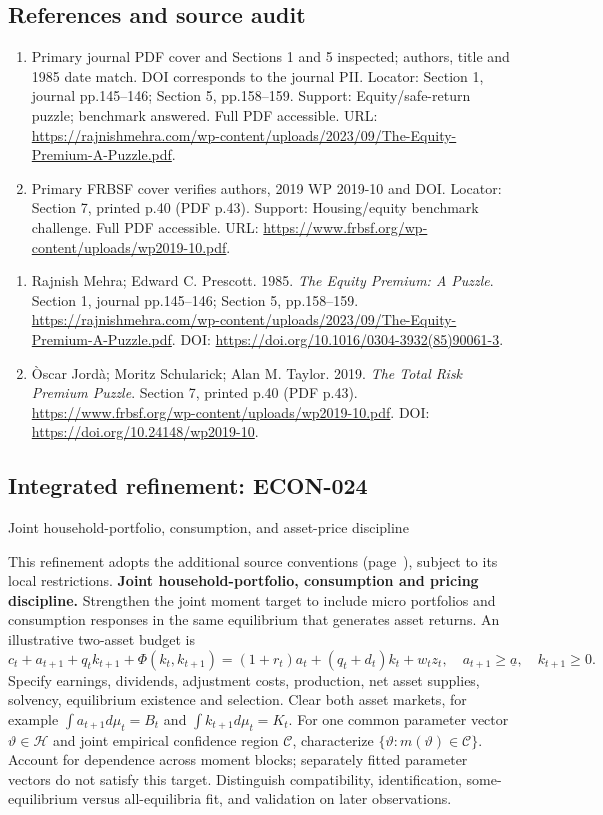 \documentclass[11pt,a4paper]{article}
\begin{document}
\subsection*{References and source audit}
\begin{enumerate}
\item Primary journal PDF cover and Sections 1 and 5 inspected; authors, title and 1985 date match. DOI corresponds to the journal PII. Locator: Section 1, journal pp.145--146; Section 5, pp.158--159. Support: Equity/safe-return puzzle; benchmark answered. Full PDF accessible. URL: \url{https://rajnishmehra.com/wp-content/uploads/2023/09/The-Equity-Premium-A-Puzzle.pdf}.
\item Primary FRBSF cover verifies authors, 2019 WP 2019-10 and DOI. Locator: Section 7, printed p.40 (PDF p.43). Support: Housing/equity benchmark challenge. Full PDF accessible. URL: \url{https://www.frbsf.org/wp-content/uploads/wp2019-10.pdf}.
\end{enumerate}
\begin{enumerate}\raggedright
\item\hypertarget{definitions:source:30007592:1}{} Rajnish Mehra; Edward C. Prescott. 1985. \emph{The Equity Premium: A Puzzle}. Section 1, journal pp.145--146; Section 5, pp.158--159.
\url{https://rajnishmehra.com/wp-content/uploads/2023/09/The-Equity-Premium-A-Puzzle.pdf}.
DOI: \url{https://doi.org/10.1016/0304-3932(85)90061-3}.
\item\hypertarget{definitions:source:30007592:2}{} Òscar Jordà; Moritz Schularick; Alan M. Taylor. 2019. \emph{The Total Risk Premium Puzzle}. Section 7, printed p.40 (PDF p.43).
\url{https://www.frbsf.org/wp-content/uploads/wp2019-10.pdf}.
DOI: \url{https://doi.org/10.24148/wp2019-10}.
\end{enumerate}

\subsection*{Integrated refinement: ECON-024}
{\sffamily\small\color{muted}Joint household-portfolio, consumption, and asset-price discipline\par}
This refinement adopts the additional source conventions
(page~\pageref{audited:conventions}), subject to its local restrictions.
\textbf{Joint household-portfolio, consumption and pricing discipline.}
Strengthen the joint moment target to include micro portfolios and consumption
responses in the same equilibrium that generates asset returns. An illustrative
two-asset budget is
\[
c_t+a_{t+1}+q_tk_{t+1}+\Phi(k_t,k_{t+1})
=(1+r_t)a_t+(q_t+d_t)k_t+w_tz_t,
\quad a_{t+1}\geq\underline a,\quad k_{t+1}\geq0.
\]
Specify earnings, dividends, adjustment costs, production, net asset supplies,
solvency, equilibrium existence and selection. Clear both asset markets, for
example $\int a_{t+1}d\mu_t=B_t$ and $\int k_{t+1}d\mu_t=K_t$.
For one common parameter vector $\vartheta\in\mathcal H$ and joint empirical
confidence region $\mathcal C$, characterize
$\{\vartheta:m(\vartheta)\in\mathcal C\}$. Account for dependence across moment
blocks; separately fitted parameter vectors do not satisfy this target.
Distinguish compatibility, identification, some-equilibrium versus
all-equilibria fit, and validation on later observations.
\end{document}
